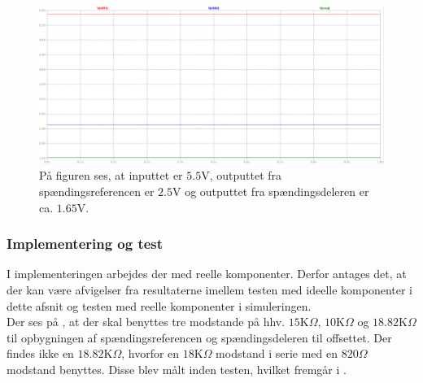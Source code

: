 \begin{figure}[H]
	\centering
	\includegraphics[scale=.3]{figures/cProblemloesning/Reference_sim_off.PNG}
	\caption{På figuren ses, at inputtet er $5.5$V, outputtet fra spændingsreferencen er $2.5$V og outputtet fra spændingsdeleren er ca. $1.65$V.}
	\label{fig:Spaendingsreference_offset_sim}
\end{figure}

\subsubsection{Implementering og test}\label{spaendingsref_resultat}
I implementeringen arbejdes der med reelle komponenter. Derfor antages det, at der kan være afvigelser fra resultaterne imellem testen med ideelle komponenter i dette afsnit og testen med reelle komponenter i simuleringen. \\
Der ses på , at der skal benyttes tre modstande på hhv. $15$K$\Omega$, $10$K$\Omega$ og $18.82$K$\Omega$ til opbygningen af spændingsreferencen og spændingsdeleren til offsettet. Der findes ikke en $18.82$K$\Omega$, hvorfor en $18$K$\Omega$ modstand i serie med en $820\Omega$ modstand benyttes. Disse blev målt inden testen, hvilket fremgår i .

